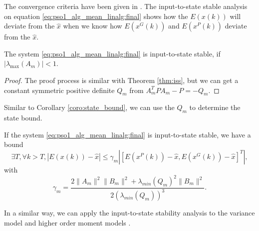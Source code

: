The convergence criteria have been given in \cite{Jiang20078}.
The input-to-state stable analysis on equation \eqref{eq:pso1_alg_mean_linalg:final} shows how the $ E(x(k)) $ will deviate from the $ \hat{x} $ when we know how $ E( x^{G}(k) ) $ and $ E( x^{P}(k) ) $ deviate from the $ \hat{x} $.

\begin{mythm}
The system \eqref{eq:pso1_alg_mean_linalg:final} is input-to-state stable, if $ | \lambda_{\max} ( A_{m} ) | < 1 $.
\begin{proof}
The proof process is similar with Theorem \ref{thm:iss}, but we can get a constant symmetric positive definite $ Q_{m} $ from $ A_{m}^{T} P A_{m} - P = - Q_{m} $.
\end{proof}
\end{mythm}


Similar to Corollary \ref{coro:state_bound}, we can use the $ Q_{m} $ to determine the state bound.
\begin{mycoro}
If the system \eqref{eq:pso1_alg_mean_linalg:final} is input-to-state stable, we have a bound 
\begin{equation}
\exists T, \forall k > T, 
| E( x(k) ) - \hat{x} | \leq  \gamma_{m} | [ E( x^{P}(k) ) - \hat{x} ,  E( x^{G}(k) ) - \hat{x} ]^{T} |,
\end{equation}
with 
\begin{equation}
\gamma_{m} = \frac{ 2 \lVert A_{m} \rVert^{2} \lVert B_{m} \rVert^{2} + \lambda_{min}( Q_{m} )^{2} \lVert B_{m} \rVert^{2} }{ 2( \lambda_{min}( Q_{m} ) )^{3} }.
\end{equation}
\end{mycoro}

In a similar way, we can apply the input-to-state stability analysis to the variance model \cite{Jiang20078} and higher order moment models \cite{Poli:2007:EAS:1276958.1276977}.
